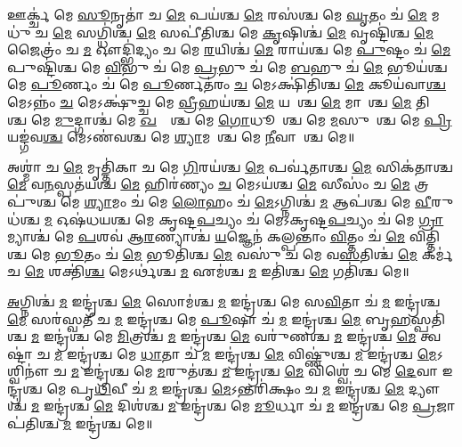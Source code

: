 
𑌊𑌰𑍍𑌕𑍍𑌚॑ 𑌮𑍇 \ul{𑌸𑍂}𑌨𑍃𑌤𑌾॑ 𑌚 \ul{𑌮𑍇} 𑌪𑌯॑𑌶𑍍𑌚 \ul{𑌮𑍇} 𑌰𑌸॑𑌶𑍍𑌚 𑌮𑍇 \ul{𑌘𑍃}𑌤𑌂 𑌚॑ \ul{𑌮𑍇} 𑌮𑌧𑍁॑ 𑌚 \ul{𑌮𑍇} 𑌸𑌗𑍍𑌧𑌿॑𑌶𑍍𑌚 \ul{𑌮𑍇} 𑌸𑌪𑍀॑𑌤𑌿𑌶𑍍𑌚 𑌮𑍇 \ul{𑌕𑍃}𑌷𑌿𑌶𑍍𑌚॑ \ul{𑌮𑍇} 𑌵𑍃𑌷𑍍𑌟𑌿॑𑌶𑍍𑌚 \ul{𑌮𑍇} 𑌜𑍈𑌤𑍍𑌰𑌂॑ 𑌚 \ul{𑌮} 𑌔𑌦𑍍𑌭𑌿॑𑌦𑍍𑌯𑌂 𑌚 𑌮𑍇 \ul{𑌰}𑌯𑌿𑌶𑍍𑌚॑ \ul{𑌮𑍇} 𑌰𑌾𑌯॑𑌶𑍍𑌚 𑌮𑍇 \ul{𑌪𑍁}𑌷𑍍𑌟𑌂 𑌚॑ \ul{𑌮𑍇} 𑌪𑍁𑌷𑍍𑌟𑌿॑𑌶𑍍𑌚 𑌮𑍇 \ul{𑌵𑌿}𑌭𑍁 𑌚॑ 𑌮𑍇 \ul{𑌪𑍍𑌰}𑌭𑍁 𑌚॑ 𑌮𑍇 \ul{𑌬}𑌹𑍁 𑌚॑ \ul{𑌮𑍇} 𑌭𑍂𑌯॑𑌶𑍍𑌚 𑌮𑍇 \ul{𑌪𑍂}𑌰𑍍𑌣𑌂 𑌚॑ 𑌮𑍇 \ul{𑌪𑍂}𑌰𑍍𑌣𑌤॑𑌰𑌂 \ul{𑌚} 𑌮𑍇𑌽𑌕𑍍𑌷𑌿॑𑌤𑌿𑌶𑍍𑌚 \ul{𑌮𑍇} 𑌕𑍂𑌯॑𑌵𑌾\ul{𑌶𑍍𑌚} 𑌮𑍇𑌽𑌨𑍍𑌨𑌂॑ \ul{𑌚} 𑌮𑍇𑌽𑌕𑍍𑌷𑍁॑𑌚𑍍𑌚 𑌮𑍇 \ul{𑌵𑍍𑌰𑍀}𑌹𑌯॑𑌶𑍍𑌚 \ul{𑌮𑍇} 𑌯𑌵𑌾᳚𑌶𑍍𑌚 \ul{𑌮𑍇} 𑌮𑌾𑌷𑌾᳚𑌶𑍍𑌚 \ul{𑌮𑍇} 𑌤𑌿𑌲𑌾᳚𑌶𑍍𑌚 𑌮𑍇 \ul{𑌮𑍁}𑌦𑍍𑌗𑌾𑌶𑍍𑌚॑ 𑌮𑍇 \ul{𑌖}𑌲𑍍𑌵𑌾᳚𑌶𑍍𑌚 𑌮𑍇 \ul{𑌗𑍋}𑌧𑍂𑌮𑌾᳚𑌶𑍍𑌚 𑌮𑍇 \ul{𑌮}𑌸𑍁𑌰𑌾᳚𑌶𑍍𑌚 𑌮𑍇 \ul{𑌪𑍍𑌰𑌿}𑌯𑌙𑍍𑌗॑𑌵\ul{𑌶𑍍𑌚} 𑌮𑍇𑌽𑌣॑𑌵𑌶𑍍𑌚 𑌮𑍇 \ul{𑌶𑍍𑌯𑌾}𑌮𑌕𑌾᳚𑌶𑍍𑌚 𑌮𑍇 \ul{𑌨𑍀}𑌵𑌾𑌰𑌾᳚𑌶𑍍𑌚 𑌮𑍇॥ 


𑌅𑌶𑍍𑌮𑌾॑ 𑌚 \ul{𑌮𑍇} 𑌮𑍃𑌤𑍍𑌤𑌿॑𑌕𑌾 𑌚 𑌮𑍇 \ul{𑌗𑌿}𑌰𑌯॑𑌶𑍍𑌚 \ul{𑌮𑍇} 𑌪𑌰𑍍𑌵॑𑌤𑌾𑌶𑍍𑌚 \ul{𑌮𑍇} 𑌸𑌿𑌕॑𑌤𑌾𑌶𑍍𑌚 \ul{𑌮𑍇} 𑌵\ul{𑌨}𑌸𑍍𑌪𑌤॑𑌯𑌶𑍍𑌚 \ul{𑌮𑍇} 𑌹𑌿𑌰॑𑌣𑍍𑌯𑌂 \ul{𑌚} 𑌮𑍇𑌽𑌯॑𑌶𑍍𑌚 \ul{𑌮𑍇} 𑌸𑍀𑌸𑌂॑ 𑌚 \ul{𑌮𑍇} 𑌤𑍍𑌰𑌪𑍁॑𑌶𑍍𑌚 𑌮𑍇 \ul{𑌶𑍍𑌯𑌾}𑌮𑌂 𑌚॑ 𑌮𑍇 \ul{𑌲𑍋}𑌹𑌂 𑌚॑ \ul{𑌮𑍇}𑌽𑌗𑍍𑌨𑌿𑌶𑍍𑌚॑ \ul{𑌮} 𑌆𑌪॑𑌶𑍍𑌚 𑌮𑍇 \ul{𑌵𑍀}𑌰𑍁𑌧॑𑌶𑍍𑌚 \ul{𑌮} 𑌓𑌷॑𑌧𑌯𑌶𑍍𑌚 𑌮𑍇 𑌕𑍃𑌷𑍍𑌟\ul{𑌪}𑌚𑍍𑌯𑌂 𑌚॑ 𑌮𑍇𑌽𑌕𑍃𑌷𑍍𑌟\ul{𑌪}𑌚𑍍𑌯𑌂 𑌚॑ 𑌮𑍇 \ul{𑌗𑍍𑌰𑌾}𑌮𑍍𑌯𑌾𑌶𑍍𑌚॑ 𑌮𑍇 \ul{𑌪}𑌶𑌵॑ 𑌆\ul{𑌰}𑌣𑍍𑌯𑌾𑌶𑍍𑌚॑ \ul{𑌯}𑌜𑍍𑌞𑍇𑌨॑ 𑌕𑌲𑍍𑌪𑌨𑍍𑌤𑌾𑌂 \ul{𑌵𑌿}𑌤𑍍𑌤𑌂 𑌚॑ \ul{𑌮𑍇} 𑌵𑌿𑌤𑍍𑌤𑌿॑𑌶𑍍𑌚 𑌮𑍇 \ul{𑌭𑍂}𑌤𑌂 𑌚॑ \ul{𑌮𑍇} 𑌭𑍂𑌤𑌿॑𑌶𑍍𑌚 \ul{𑌮𑍇} 𑌵𑌸𑍁॑ 𑌚 𑌮𑍇 𑌵\ul{𑌸}𑌤𑌿𑌶𑍍𑌚॑ \ul{𑌮𑍇} 𑌕𑌰𑍍𑌮॑ 𑌚 \ul{𑌮𑍇} 𑌶𑌕𑍍𑌤𑌿॑\ul{𑌶𑍍𑌚} 𑌮𑍇𑌽𑌰𑍍𑌥॑𑌶𑍍𑌚 \ul{𑌮} 𑌏𑌮॑𑌶𑍍𑌚 \ul{𑌮} 𑌇𑌤𑌿॑𑌶𑍍𑌚 \ul{𑌮𑍇} 𑌗𑌤𑌿॑𑌶𑍍𑌚 𑌮𑍇॥


\ul{𑌅}𑌗𑍍𑌨𑌿𑌶𑍍𑌚॑ \ul{𑌮} 𑌇𑌨𑍍𑌦𑍍𑌰॑𑌶𑍍𑌚 \ul{𑌮𑍇} 𑌸𑍋𑌮॑𑌶𑍍𑌚 \ul{𑌮} 𑌇𑌨𑍍𑌦𑍍𑌰॑𑌶𑍍𑌚 𑌮𑍇 𑌸\ul{𑌵𑌿}𑌤𑌾 𑌚॑ \ul{𑌮} 𑌇𑌨𑍍𑌦𑍍𑌰॑𑌶𑍍𑌚 \ul{𑌮𑍇} 𑌸𑌰॑𑌸𑍍𑌵𑌤𑍀 𑌚 \ul{𑌮} 𑌇𑌨𑍍𑌦𑍍𑌰॑𑌶𑍍𑌚 𑌮𑍇 \ul{𑌪𑍂}𑌷𑌾 𑌚॑ \ul{𑌮} 𑌇𑌨𑍍𑌦𑍍𑌰॑𑌶𑍍𑌚 \ul{𑌮𑍇} 𑌬𑍃\ul{𑌹}𑌸𑍍𑌪𑌤𑌿॑𑌶𑍍𑌚 \ul{𑌮} 𑌇𑌨𑍍𑌦𑍍𑌰॑𑌶𑍍𑌚 𑌮𑍇 \ul{𑌮𑌿}𑌤𑍍𑌰𑌶𑍍𑌚॑ \ul{𑌮} 𑌇𑌨𑍍𑌦𑍍𑌰॑𑌶𑍍𑌚 \ul{𑌮𑍇} 𑌵𑌰𑍁॑𑌣𑌶𑍍𑌚 \ul{𑌮} 𑌇𑌨𑍍𑌦𑍍𑌰॑𑌶𑍍𑌚 \ul{𑌮𑍇} 𑌤𑍍𑌵𑌷𑍍𑌟𑌾॑ 𑌚 \ul{𑌮} 𑌇𑌨𑍍𑌦𑍍𑌰॑𑌶𑍍𑌚 𑌮𑍇 \ul{𑌧𑌾}𑌤𑌾 𑌚॑ \ul{𑌮} 𑌇𑌨𑍍𑌦𑍍𑌰॑𑌶𑍍𑌚 \ul{𑌮𑍇} 𑌵𑌿𑌷𑍍𑌣𑍁॑𑌶𑍍𑌚 \ul{𑌮} 𑌇𑌨𑍍𑌦𑍍𑌰॑𑌶𑍍𑌚 \ul{𑌮𑍇}𑌽𑌶𑍍𑌵𑌿𑌨𑍗॑ 𑌚 \ul{𑌮} 𑌇𑌨𑍍𑌦𑍍𑌰॑𑌶𑍍𑌚 𑌮𑍇 \ul{𑌮}𑌰𑍁𑌤॑𑌶𑍍𑌚 \ul{𑌮} 𑌇𑌨𑍍𑌦𑍍𑌰॑𑌶𑍍𑌚 \ul{𑌮𑍇} 𑌵𑌿𑌶𑍍𑌵𑍇॑ 𑌚 𑌮𑍇 \ul{𑌦𑍇}𑌵𑌾 𑌇𑌨𑍍𑌦𑍍𑌰॑𑌶𑍍𑌚 𑌮𑍇 𑌪𑍃\ul{𑌥𑌿}𑌵𑍀 𑌚॑ \ul{𑌮} 𑌇𑌨𑍍𑌦𑍍𑌰॑𑌶𑍍𑌚 \ul{𑌮𑍇}𑌽𑌨𑍍𑌤𑌰𑌿॑𑌕𑍍𑌷𑌂 𑌚 \ul{𑌮} 𑌇𑌨𑍍𑌦𑍍𑌰॑𑌶𑍍𑌚 \ul{𑌮𑍇} 𑌦𑍍𑌯𑍗𑌶𑍍𑌚॑ \ul{𑌮} 𑌇𑌨𑍍𑌦𑍍𑌰॑𑌶𑍍𑌚 \ul{𑌮𑍇} 𑌦𑌿𑌶॑𑌶𑍍𑌚 \ul{𑌮} 𑌇𑌨𑍍𑌦𑍍𑌰॑𑌶𑍍𑌚 𑌮𑍇 \ul{𑌮𑍂}𑌰𑍍𑌧𑌾 𑌚॑ \ul{𑌮} 𑌇𑌨𑍍𑌦𑍍𑌰॑𑌶𑍍𑌚 𑌮𑍇 \ul{𑌪𑍍𑌰}𑌜𑌾𑌪॑𑌤𑌿𑌶𑍍𑌚 \ul{𑌮} 𑌇𑌨𑍍𑌦𑍍𑌰॑𑌶𑍍𑌚 𑌮𑍇॥

